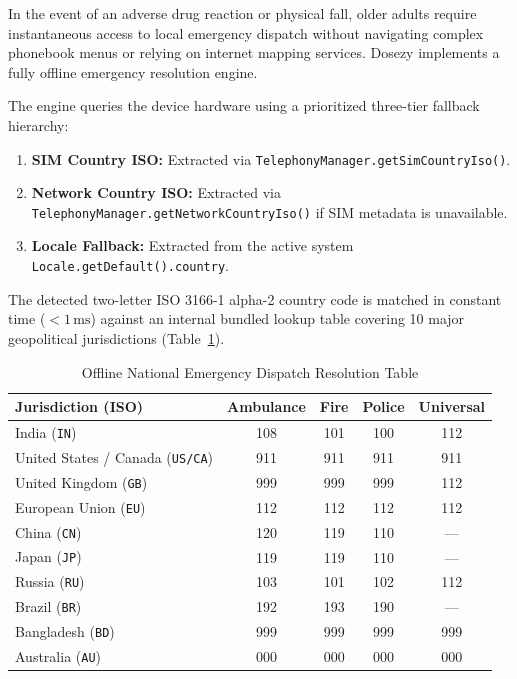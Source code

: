 \documentclass[11pt,a4paper]{article}
\begin{document}
In the event of an adverse drug reaction or physical fall, older adults require instantaneous access to local emergency dispatch without navigating complex phonebook menus or relying on internet mapping services. Dosezy implements a fully offline emergency resolution engine.

The engine queries the device hardware using a prioritized three-tier fallback hierarchy:
\begin{enumerate}
    \item \textbf{SIM Country ISO:} Extracted via \texttt{TelephonyManager.getSimCountryIso()}.
    \item \textbf{Network Country ISO:} Extracted via \texttt{TelephonyManager.getNetworkCountryIso()} if SIM metadata is unavailable.
    \item \textbf{Locale Fallback:} Extracted from the active system \texttt{Locale.getDefault().country}.
\end{enumerate}

The detected two-letter ISO 3166-1 alpha-2 country code is matched in constant time ($< 1\,\text{ms}$) against an internal bundled lookup table covering 10 major geopolitical jurisdictions (Table~\ref{tab:emergency_numbers}).

\begin{table}[htbp]
\centering
\small
\caption{Offline National Emergency Dispatch Resolution Table}
\label{tab:emergency_numbers}
\begin{tabular}{lcccc}
\toprule
\textbf{Jurisdiction (ISO)} & \textbf{Ambulance} & \textbf{Fire} & \textbf{Police} & \textbf{Universal} \\
\midrule
India (\texttt{IN}) & 108 & 101 & 100 & 112 \\
United States / Canada (\texttt{US/CA}) & 911 & 911 & 911 & 911 \\
United Kingdom (\texttt{GB}) & 999 & 999 & 999 & 112 \\
European Union (\texttt{EU}) & 112 & 112 & 112 & 112 \\
China (\texttt{CN}) & 120 & 119 & 110 & --- \\
Japan (\texttt{JP}) & 119 & 119 & 110 & --- \\
Russia (\texttt{RU}) & 103 & 101 & 102 & 112 \\
Brazil (\texttt{BR}) & 192 & 193 & 190 & --- \\
Bangladesh (\texttt{BD}) & 999 & 999 & 999 & 999 \\
Australia (\texttt{AU}) & 000 & 000 & 000 & 000 \\
\bottomrule
\end{tabular}
\end{table}
\end{document}
